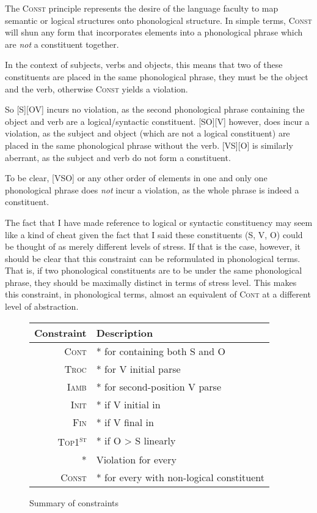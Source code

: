 \documentclass{article}
\newcommand{\cont}{\textsc{Cont}}
\newcommand{\iamb}{\textsc{Iamb}}
\newcommand{\cons}{\textsc{Const}}
\newcommand{\topf}{\textsc{Top1\textsuperscript{st}}}
\newcommand{\nophi}{\textsc{*\textphi}}
\newcommand{\finphi}{\textsc{Fin\textphi}}
\newcommand{\initphi}{\textsc{Init\textphi}}
\newcommand{\troc}{\textsc{Troc}}
\begin{document}
The {\cons} principle represents the desire of the language faculty to map semantic or logical structures onto phonological structure.
In simple terms, {\cons} will shun any form that incorporates elements into a phonological phrase which are \emph{not} a constituent together.

In the context of subjects, verbs and objects, this means that two of these constituents are placed in the same phonological phrase, they must be the object and the verb, otherwise {\cons} yields a violation.

So [S][OV] incurs no violation, as the second phonological phrase containing the object and verb are a logical/syntactic constituent.
[SO][V] however, does incur a violation, as the subject and object (which are not a logical constituent) are placed in the same phonological phrase without the verb.
[VS][O] is similarly aberrant, as the subject and verb do not form a constituent.

To be clear, [VSO] or any other order of elements in one and only one phonological phrase does \emph{not} incur a violation, as the whole phrase is indeed a constituent.

 The fact that I have made reference to logical or syntactic constituency may seem like a kind of cheat given the fact that I said these constituents (S, V, O) could be thought of as merely different levels of stress.
 If that is the case, however, it should be clear that this constraint can be reformulated in phonological terms.
 That is, if two phonological constituents are to be under the same phonological phrase, they should be maximally distinct in terms of stress level.
 This makes this constraint, in phonological terms, almost an equivalent of {\cont} at a different level of abstraction.

 \begin{figure}
	 \begin{center}
		 \begin{tabular}{rl}
			 Constraint&Description\\\hline\hline
			 \cont&* for {\textphi} containing both S and O\\
			 \troc&* for V initial parse\\
			 \iamb&* for second-position V parse\\
			 \initphi&* if V initial in \textphi\\
			 \finphi&* if V final in \textphi\\
			 \topf&* if O {\textgreater} S linearly\\
			 \nophi&Violation for every {\textphi}\\
			 \cons&* for every {\textphi} with non-logical constituent \\
		 \end{tabular}
	 \end{center}

	 \caption{Summary of constraints\label{consum}}
 \end{figure}
\end{document}

